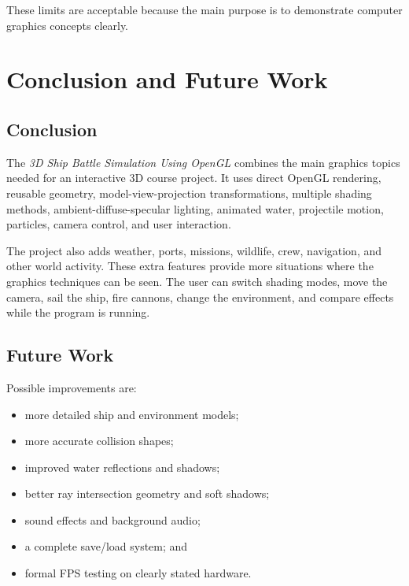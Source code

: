 \documentclass[12pt,a4paper]{report}
\begin{document}
These limits are acceptable because the main purpose is to demonstrate computer graphics concepts clearly.

\chapter{Conclusion and Future Work}

\section{Conclusion}
The \emph{3D Ship Battle Simulation Using OpenGL} combines the main graphics topics needed for an interactive 3D course project. It uses direct OpenGL rendering, reusable geometry, model-view-projection transformations, multiple shading methods, ambient-diffuse-specular lighting, animated water, projectile motion, particles, camera control, and user interaction.

The project also adds weather, ports, missions, wildlife, crew, navigation, and other world activity. These extra features provide more situations where the graphics techniques can be seen. The user can switch shading modes, move the camera, sail the ship, fire cannons, change the environment, and compare effects while the program is running.

\section{Future Work}
Possible improvements are:
\begin{itemize}
    \item more detailed ship and environment models;
    \item more accurate collision shapes;
    \item improved water reflections and shadows;
    \item better ray intersection geometry and soft shadows;
    \item sound effects and background audio;
    \item a complete save/load system; and
    \item formal FPS testing on clearly stated hardware.
\end{itemize}

\renewcommand{\bibname}{References}
\small


\end{document}
